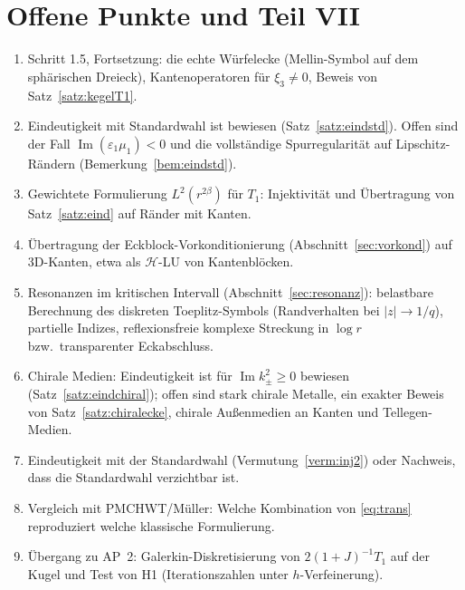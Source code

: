 \documentclass[11pt, a4paper]{article}
\theoremstyle{plain}
\theoremstyle{definition}
\begin{document}
\section{Offene Punkte und Teil VII}\label{sec:offen}

\begin{enumerate}[leftmargin=*]
  \item Schritt 1.5, Fortsetzung: die echte Würfelecke (Mellin-Symbol auf dem
    sphärischen Dreieck), Kantenoperatoren für $\xi_3\neq0$, Beweis von
    Satz~\ref{satz:kegelT1}.
  \item Eindeutigkeit mit Standardwahl ist bewiesen (Satz~\ref{satz:eindstd}).
    Offen sind der Fall $\operatorname{Im}(\varepsilon_1\mu_1)<0$ und die
    vollständige Spurregularität auf Lipschitz-Rändern (Bemerkung~\ref{bem:eindstd}).
  \item Gewichtete Formulierung $L^2(r^{2\beta})$ für $T_1$: Injektivität und
    Übertragung von Satz~\ref{satz:eind} auf Ränder mit Kanten.
  \item Übertragung der Eckblock-Vorkonditionierung (Abschnitt~\ref{sec:vorkond})
    auf 3D-Kanten, etwa als $\mathcal{H}$-LU von Kantenblöcken.
  \item Resonanzen im kritischen Intervall (Abschnitt~\ref{sec:resonanz}):
    belastbare Berechnung des diskreten Toeplitz-Symbols (Randverhalten bei
    $|z|\to1/q$), partielle Indizes, reflexionsfreie komplexe Streckung in $\log r$
    bzw.\ transparenter Eckabschluss.
  \item Chirale Medien: Eindeutigkeit ist für $\operatorname{Im}k_\pm^2\ge0$ bewiesen
    (Satz~\ref{satz:eindchiral}); offen sind stark chirale Metalle, ein exakter
    Beweis von Satz~\ref{satz:chiralecke}, chirale Außenmedien an Kanten und Tellegen-Medien.
  \item Eindeutigkeit mit der Standardwahl (Vermutung~\ref{verm:inj2}) oder
    Nachweis, dass die Standardwahl verzichtbar ist.
  \item Vergleich mit PMCHWT/Müller: Welche Kombination von \eqref{eq:trans}
    reproduziert welche klassische Formulierung.
  \item Übergang zu AP~2: Galerkin-Diskretisierung von $2(1+J)^{-1}T_1$ auf der
    Kugel und Test von H1 (Iterationszahlen unter $h$-Verfeinerung).
\end{enumerate}
\end{document}
